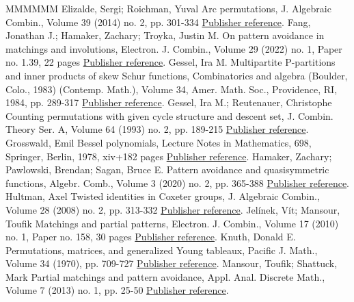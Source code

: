 \begin{thebibliography}{MMMMMM}
 Elizalde, Sergi; Roichman, Yuval Arc permutations, J. Algebraic Combin., Volume 39 (2014) no. 2, pp. 301-334 \href{https://alco.centre-mersenne.org/articles/10.5802/alco.351/#arc_pattern_avoiding}{Publisher reference}.
 Fang, Jonathan J.; Hamaker, Zachary; Troyka, Justin M. On pattern avoidance in matchings and involutions, Electron. J. Combin., Volume 29 (2022) no. 1, Paper no. 1.39, 22 pages \href{https://alco.centre-mersenne.org/articles/10.5802/alco.351/#fang2022pattern}{Publisher reference}.
 Gessel, Ira M. Multipartite P-partitions and inner products of skew Schur functions, Combinatorics and algebra (Boulder, Colo., 1983) (Contemp. Math.), Volume 34, Amer. Math. Soc., Providence, RI, 1984, pp. 289-317 \href{https://alco.centre-mersenne.org/articles/10.5802/alco.351/#knuth_classes_schur_positive}{Publisher reference}.
 Gessel, Ira M.; Reutenauer, Christophe Counting permutations with given cycle structure and descent set, J. Combin. Theory Ser. A, Volume 64 (1993) no. 2, pp. 189-215 \href{https://alco.centre-mersenne.org/articles/10.5802/alco.351/#gessel1993counting}{Publisher reference}.
 Grosswald, Emil Bessel polynomials, Lecture Notes in Mathematics, 698, Springer, Berlin, 1978, xiv+182 pages \href{https://alco.centre-mersenne.org/articles/10.5802/alco.351/#bessel_polynomials_book}{Publisher reference}.
 Hamaker, Zachary; Pawlowski, Brendan; Sagan, Bruce E. Pattern avoidance and quasisymmetric functions, Algebr. Comb., Volume 3 (2020) no. 2, pp. 365-388 \href{https://alco.centre-mersenne.org/articles/10.5802/alco.351/#S3_patterns_list}{Publisher reference}.
 Hultman, Axel Twisted identities in Coxeter groups, J. Algebraic Combin., Volume 28 (2008) no. 2, pp. 313-332 \href{https://alco.centre-mersenne.org/articles/10.5802/alco.351/#hultman2008twisted}{Publisher reference}.
 Jelínek, Vít; Mansour, Toufik Matchings and partial patterns, Electron. J. Combin., Volume 17 (2010) no. 1, Paper no. 158, 30 pages \href{https://alco.centre-mersenne.org/articles/10.5802/alco.351/#jelinek2010matchings}{Publisher reference}.
 Knuth, Donald E. Permutations, matrices, and generalized Young tableaux, Pacific J. Math., Volume 34 (1970), pp. 709-727 \href{https://alco.centre-mersenne.org/articles/10.5802/alco.351/#knuth1970permutations}{Publisher reference}.
 Mansour, Toufik; Shattuck, Mark Partial matchings and pattern avoidance, Appl. Anal. Discrete Math., Volume 7 (2013) no. 1, pp. 25-50 \href{https://alco.centre-mersenne.org/articles/10.5802/alco.351/#mansour2013partial}{Publisher reference}.

\end{thebibliography}
